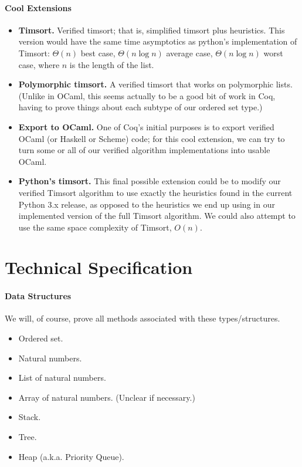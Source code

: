 \documentclass{article}
\begin{document}
\paragraph{Cool Extensions}
\begin{itemize}
  \item \textbf{Timsort.}
    Verified timsort; that is, simplified timsort plus heuristics.
    This version would have the same time asymptotics as python's
    implementation of Timsort:
    $\Theta(n)$ best case,
    $\Theta(n \log n)$ average case,
    $\Theta(n \log n)$ worst case,
    where $n$ is the length of the list.

  \item \textbf{Polymorphic timsort.}
    A verified timsort that works on polymorphic lists. (Unlike in OCaml,
    this seems actually to be a good bit of work in Coq, having to prove
    things about each subtype of our ordered set type.)

  \item \textbf{Export to OCaml.}
    One of Coq's initial purposes is to export verified OCaml (or Haskell
    or Scheme) code; for this cool extension, we can try to turn some or all
    of our verified algorithm implementations into usable OCaml.

  \item \textbf{Python's timsort.}
    This final possible extension could be to modify our verified Timsort
    algorithm to use exactly the heuristics found in the current Python 3.x
    release, as opposed to the heuristics we end up using in our implemented
    version of the full Timsort algorithm.
    We could also attempt to use the same space complexity of
    Timsort, $O(n)$.
\end{itemize}


\section{Technical Specification}
\paragraph{Data Structures}
We will, of course, prove all methods associated with these types/structures.

\begin{itemize}
  \item Ordered set.
  \item Natural numbers.
  \item List of natural numbers.
  \item Array of natural numbers.
    (Unclear if necessary.)
  \item Stack.
  \item Tree.
  \item Heap (a.k.a. Priority Queue).
\end{itemize}
\end{document}
